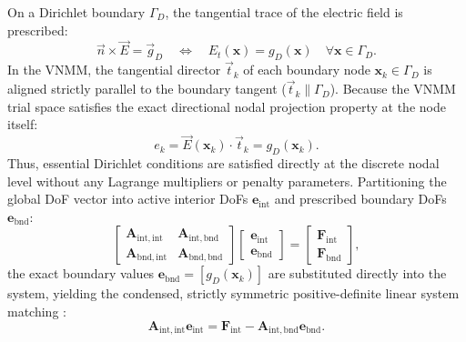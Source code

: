 \documentclass[VANCOUVER,Times1COL]{WileyNJD-v5}
\begin{document}
On a Dirichlet boundary $\Gamma_D$, the tangential trace of the electric field is prescribed:
\begin{equation}
    \vec{n} \times \vec{E} = \vec{g}_D \quad \iff \quad E_t(\mathbf{x}) = g_D(\mathbf{x}) \quad \forall \mathbf{x} \in \Gamma_D.
    \label{eq:dirichlet_prescribed}
\end{equation}
In the VNMM, the tangential director $\vec{t}_k$ of each boundary node $\mathbf{x}_k \in \Gamma_D$ is aligned strictly parallel to the boundary tangent ($\vec{t}_k \parallel \Gamma_D$). Because the VNMM trial space satisfies the exact directional nodal projection property at the node itself:
\begin{equation}
    e_k = \vec{E}(\mathbf{x}_k) \cdot \vec{t}_k = g_D(\mathbf{x}_k).
    \label{eq:dirichlet_nodal_value}
\end{equation}
Thus, essential Dirichlet conditions are satisfied directly at the discrete nodal level without any Lagrange multipliers or penalty parameters. Partitioning the global DoF vector into active interior DoFs $\mathbf{e}_{\mathrm{int}}$ and prescribed boundary DoFs $\mathbf{e}_{\mathrm{bnd}}$:
\begin{equation}
    \begin{bmatrix}
        \mathbf{A}_{\mathrm{int}, \mathrm{int}} & \mathbf{A}_{\mathrm{int}, \mathrm{bnd}} \\
        \mathbf{A}_{\mathrm{bnd}, \mathrm{int}} & \mathbf{A}_{\mathrm{bnd}, \mathrm{bnd}}
    \end{bmatrix}
    \begin{bmatrix}
        \mathbf{e}_{\mathrm{int}} \\
        \mathbf{e}_{\mathrm{bnd}}
    \end{bmatrix}
    =
    \begin{bmatrix}
        \mathbf{F}_{\mathrm{int}} \\
        \mathbf{F}_{\mathrm{bnd}}
    \end{bmatrix},
\end{equation}
the exact boundary values $\mathbf{e}_{\mathrm{bnd}} = [g_D(\mathbf{x}_k)]$ are substituted directly into the system, yielding the condensed, strictly symmetric positive-definite linear system matching \cite{stable_vnmm2d_2026}:
\begin{equation}
    \mathbf{A}_{\mathrm{int}, \mathrm{int}} \mathbf{e}_{\mathrm{int}} = \mathbf{F}_{\mathrm{int}} - \mathbf{A}_{\mathrm{int}, \mathrm{bnd}} \mathbf{e}_{\mathrm{bnd}}.
    \label{eq:dirichlet_condensed_system}
\end{equation}
\end{document}
